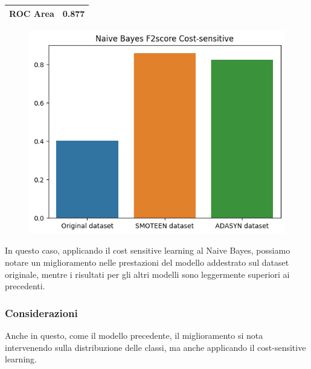 \documentclass[italian,12pt,a4paper]{article}
\begin{document}
\begin{center}
\begin{table}[h]
\begin{tabular}{|p{2cm}|r|}
				ROC Area & 0.877 \\ \hline  
			\end{tabular}
		\end{table}
		\begin{figure}[h]
			\centering
			\includegraphics[scale=0.73]{BayesCostSens}
		\end{figure}
	\end{center}
	
	In questo caso, applicando il cost sensitive learning al Naive Bayes, possiamo notare un miglioramento nelle prestazioni del modello addestrato sul dataset originale, mentre i risultati per gli altri modelli sono leggermente superiori ai precedenti.
	
	\subsubsection{Considerazioni}
	Anche in questo, come il modello precedente, il miglioramento si nota intervenendo sulla distribuzione delle classi, ma anche applicando il cost-sensitive learning.
	
	
\end{document}
